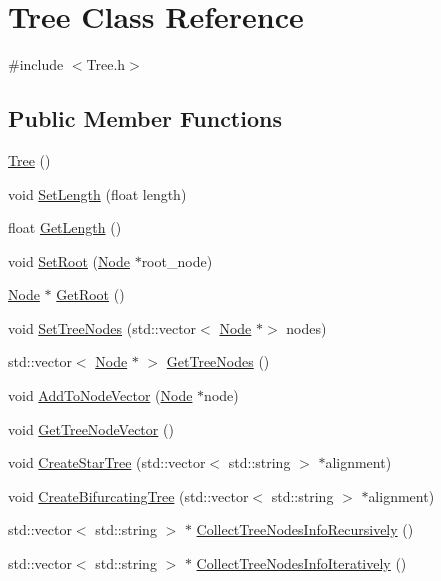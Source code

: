 \hypertarget{classTree}{}\section{Tree Class Reference}
\label{classTree}


{\ttfamily \#include $<$Tree.\+h$>$}

\subsection*{Public Member Functions}
\begin{DoxyCompactItemize}
\item 
\hyperlink{classTree_ad376a7c639d857312f5de2ef47482f68}{Tree} ()
\item 
void \hyperlink{classTree_aa16a8485326ce51d6d7324f23066eb27}{Set\+Length} (float length)
\item 
float \hyperlink{classTree_a5812392cfc9ed68d1fc3713d708a5e8f}{Get\+Length} ()
\item 
void \hyperlink{classTree_ae592faa2c1f2da3cc1157bd9a4b884b5}{Set\+Root} (\hyperlink{classNode}{Node} $\ast$root\+\_\+node)
\item 
\hyperlink{classNode}{Node} $\ast$ \hyperlink{classTree_a866593b4b067b38394a090e0d57b132f}{Get\+Root} ()
\item 
void \hyperlink{classTree_a429c0d87d451e9b219e4d001923c7134}{Set\+Tree\+Nodes} (std\+::vector$<$ \hyperlink{classNode}{Node} $\ast$$>$ nodes)
\item 
std\+::vector$<$ \hyperlink{classNode}{Node} $\ast$ $>$ \hyperlink{classTree_a390ab7f66c8c33fe6780a372263d6d38}{Get\+Tree\+Nodes} ()
\item 
void \hyperlink{classTree_aba172068387b9b5be1a6750a30e8199a}{Add\+To\+Node\+Vector} (\hyperlink{classNode}{Node} $\ast$node)
\item 
void \hyperlink{classTree_aefee00842552e70746a5ed1fdca4f91f}{Get\+Tree\+Node\+Vector} ()
\item 
void \hyperlink{classTree_ac446f0f8211fcc033502690a9a164e95}{Create\+Star\+Tree} (std\+::vector$<$ std\+::string $>$ $\ast$alignment)
\item 
void \hyperlink{classTree_ac456dedd5e42bb0fea807aeb526e5a93}{Create\+Bifurcating\+Tree} (std\+::vector$<$ std\+::string $>$ $\ast$alignment)
\item 
std\+::vector$<$ std\+::string $>$ $\ast$ \hyperlink{classTree_af09073cc7b7166d16213614b624f3388}{Collect\+Tree\+Nodes\+Info\+Recursively} ()
\item 
std\+::vector$<$ std\+::string $>$ $\ast$ \hyperlink{classTree_a9a6309402407a051b346e779169f2ffc}{Collect\+Tree\+Nodes\+Info\+Iteratively} ()
\end{DoxyCompactItemize}


